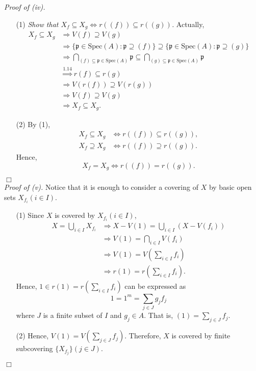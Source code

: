 \documentclass{article}
\begin{document}
\emph{Proof of (iv).}
\begin{enumerate}
\item[(1)]
\emph{Show that
$X_f \subseteq X_g \Longleftrightarrow r((f)) \subseteq r((g))$.}
Actually,
\begin{align*}
X_f \subseteq X_g
&\Longrightarrow V(f) \supseteq V(g) \\
&\Longrightarrow \{ \mathfrak{p} \in \text{Spec}(A) : \mathfrak{p} \supseteq (f) \}
  \supseteq \{ \mathfrak{p} \in \text{Spec}(A) : \mathfrak{p} \supseteq (g) \} \\
&\Longrightarrow \bigcap_{(f) \subseteq \mathfrak{p} \in \text{Spec}(A)} \mathfrak{p}
  \subseteq \bigcap_{(g) \subseteq \mathfrak{p} \in \text{Spec}(A)} \mathfrak{p}  \\
&\overset{1.14}{\Longrightarrow} r(f) \subseteq r(g) \\
&\Longrightarrow V(r(f)) \supseteq V(r(g)) \\
&\Longrightarrow V(f) \supseteq V(g) \\
&\Longrightarrow X_f \subseteq X_g.
\end{align*}
\item[(2)]
By (1),
\begin{align*}
X_f \subseteq X_g &\Longleftrightarrow r((f)) \subseteq r((g)), \\
X_f \supseteq X_g &\Longleftrightarrow r((f)) \supseteq r((g)).
\end{align*}
Hence,
$$X_f = X_g \Longleftrightarrow r((f)) = r((g)).$$
\end{enumerate}
$\Box$ \\

\emph{Proof of (v).}
Notice that it is enough to consider a covering of $X$
by basic open sets $X_{f_i} (i \in I)$.
\begin{enumerate}
\item[(1)]
Since $X$ is covered by $X_{f_i} (i \in I)$,
\begin{align*}
X = \bigcup_{i \in I} X_{f_i}
&\Longrightarrow X - V(1) = \bigcup_{i \in I} (X - V(f_i)) \\
&\Longrightarrow V(1) = \bigcap_{i \in I} V(f_i) \\
&\Longrightarrow V(1) = V\left( \sum_{i \in I} f_i \right) \\
&\Longrightarrow r(1) = r\left( \sum_{i \in I} f_i \right).
\end{align*}
Hence, $1 \in r(1) = r\left( \sum_{i \in I} f_i \right)$ can be expressed as
$$1 = 1^m = \sum_{j \in J} g_j f_j$$
where $J$ is a finite subset of $I$ and $g_j \in A$.
That is, $(1) = \sum_{j \in J} f_j$.
\item[(2)]
Hence, $V(1) = V\left( \sum_{j \in J} f_j \right)$.
Therefore, $X$ is covered by finite subcovering $\{X_{f_j}\} (j \in J)$.
\end{enumerate}
$\Box$ \\
\end{document}
